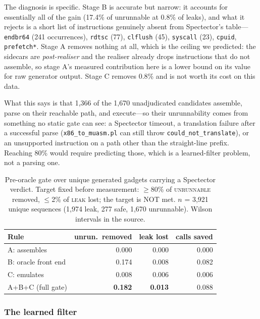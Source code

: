 \documentclass[conference]{IEEEtran}
\begin{document}
The diagnosis is specific. Stage B is accurate but narrow: it accounts for
essentially all of the gain (17.4\% of unrunnable at 0.8\% of leaks), and what
it rejects is a short list of instructions genuinely absent from Spectector's
table---\texttt{endbr64} (241 occurrences), \texttt{rdtsc} (77),
\texttt{clflush} (45), \texttt{syscall} (23), \texttt{cpuid},
\texttt{prefetch*}. Stage A removes nothing at all, which is the ceiling we
predicted: the sidecars are \emph{post-realiser} and the realiser already drops
instructions that do not assemble, so stage A's measured contribution here is a
lower bound on its value for raw generator output. Stage C removes 0.8\% and is
not worth its cost on this data.

What this says is that 1,366 of the 1,670 unadjudicated candidates assemble,
parse on their reachable path, and execute---so their unrunnability comes from
something no static gate can see: a Spectector timeout, a translation failure
after a successful parse (\texttt{x86\_to\_muasm.pl} can still throw
\texttt{could\_not\_translate}), or an unsupported instruction on a path other
than the straight-line prefix. Reaching 80\% would require predicting those,
which is a learned-filter problem, not a parsing one.

\begin{table}[t]
\centering
\caption{Pre-oracle gate over unique generated gadgets carrying a Spectector
  verdict. Target fixed before measurement: $\geq$80\% of \textsc{unrunnable}
  removed, $\leq$2\% of \textsc{leak} lost; the target is NOT met.
  $n$ = 3{,}921 unique sequences (1{,}974 leak, 277 safe, 1{,}670 unrunnable).
  Wilson intervals in the source.}
\label{tab:precheck}
\footnotesize
\setlength{\tabcolsep}{4pt}
\begin{tabular}{@{}lrrr@{}}
\toprule
Rule & unrun.\ removed & leak lost & calls saved \\
\midrule
A: assembles        & 0.000 & 0.000 & 0.000 \\
B: oracle front end & 0.174 & 0.008 & 0.082 \\
C: emulates         & 0.008 & 0.006 & 0.006 \\
A+B+C (full gate)   & \textbf{0.182} & \textbf{0.013} & 0.088 \\
\bottomrule
\end{tabular}
\end{table}

\subsubsection{The learned filter}
\label{sec:rankresults}
\end{document}
